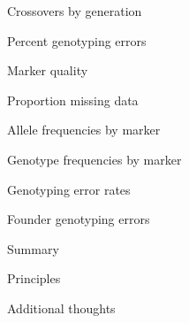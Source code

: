 \documentclass[aspectratio=169,12pt,t]{beamer}
\begin{document}
\begin{frame}[c]{Crossovers by generation}

\note{
}
\end{frame}


\begin{frame}[c]{Percent genotyping errors}

\note{
}
\end{frame}




\begin{frame}[c]{}

\centerline{\Large \color{title} Marker quality}

\note{
}

\end{frame}



\begin{frame}[c]{Proportion missing data}

\note{
}
\end{frame}


\begin{frame}[c]{Allele frequencies by marker}

\note{
}
\end{frame}

\begin{frame}[c]{Genotype frequencies by marker}

\note{
}
\end{frame}

\begin{frame}[c]{Genotyping error rates}

\note{
}
\end{frame}







\begin{frame}[c]{}

\centerline{\Large \color{title} Founder genotyping errors}

\note{
}

\end{frame}





\begin{frame}[c]{Summary}

\note{
}

\end{frame}



\begin{frame}[c]{Principles}

\note{
}

\end{frame}



\begin{frame}[c]{Additional thoughts}

\note{
}

\end{frame}
\end{document}
